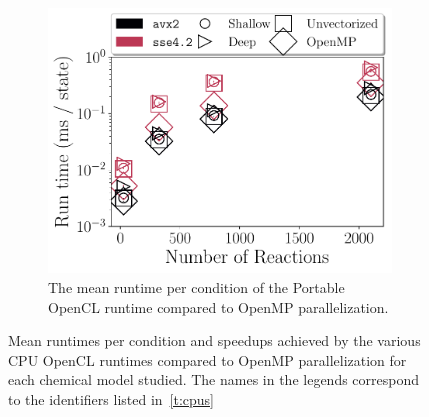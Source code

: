 \documentclass[12pt,number,sort&compress,preprint]{elsarticle}
\begin{document}
\begin{figure}[htb]
\begin{subfigure}[t]{0.45\linewidth}
      \includegraphics[width=\textwidth]{pocl_source_nonorm.pdf}
      \caption{The mean runtime per condition of the Portable OpenCL runtime compared to OpenMP parallelization.}
      \label{F:pocl_source}
  \end{subfigure}
 \caption{Mean runtimes per condition and speedups achieved by the various CPU OpenCL runtimes compared to OpenMP parallelization for each chemical model studied. The names in the legends correspond to the identifiers listed in~\cref{t:cpus}}
 \label{f:source}
\end{figure}
\end{document}
